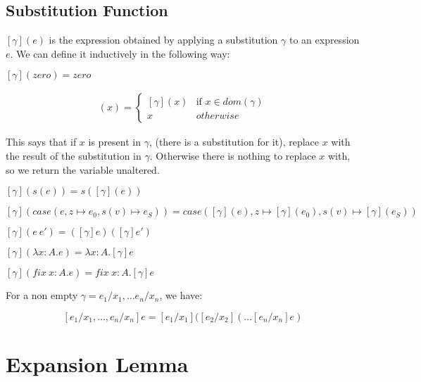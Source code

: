\vspace{0.5cm}

\subsection{Substitution Function}
$[\gamma](e)$ is the expression obtained by applying a substitution $\gamma$ to an expression $e$. We can define it inductively in the following way:

\begin{adjustwidth}{2cm}{}
$[\gamma](zero) = zero$
\end{adjustwidth}

\begin{minipage}{3.5in}
\begin{align*}
[\gamma](x) = 
  \begin{cases} 
           [\gamma](x) & \text{if } x \in dom(\gamma) \\
           x & otherwise 
  \end{cases}
\end{align*} 
\end{minipage}

This says that if $x$ is present in $\gamma$, (there is a substitution for it), replace $x$ with the result of the substitution in $\gamma$. Otherwise there is nothing to replace $x$ with, so we return the variable unaltered. 

\vspace{0.5cm}

\begin{adjustwidth}{2cm}{}
$[\gamma](s(e)) = s([\gamma] (e))$

$[\gamma](case (e, z \mapsto e_0, s(v) \mapsto e_S)) = case ([\gamma](e), z \mapsto [\gamma](e_0), s(v) \mapsto [\gamma](e_S))$

$[\gamma](e \ e') = ([\gamma] e) ([\gamma] e')$

$[\gamma] (\lambda x:A. e) = \lambda x:A. [\gamma] e$

$[\gamma] (fix \ x:A. e) = fix \ x:A. [\gamma] e$
\end{adjustwidth}

\vspace{0.5cm}

For a non empty $\gamma = e_1/x_1, \dots e_n/x_n$, we have:

\[ [e_1/x_1, \dots , e_n/x_n] e = [e_1/x_1]([e_2/x_2]( \dots [e_n/x_n] e) \]

\section{Expansion Lemma}

